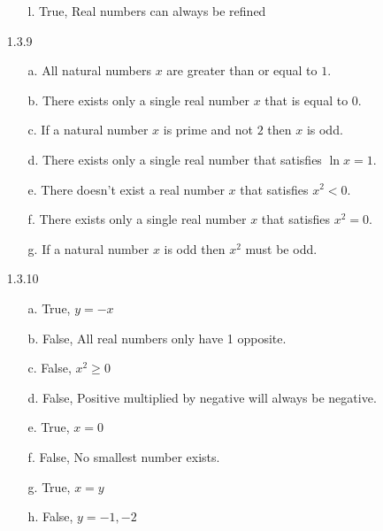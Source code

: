 \documentclass[11pt]{amsart}
\theoremstyle{definition}
\begin{document}
\begin{itemize}
\begin{itemize}
    \item[l.] True,  Real numbers can always be refined
    
\end{itemize}

\item[1.3.9]
\begin{itemize}
    \item[a.] All natural numbers $x$ are greater than or equal to $1$.

    \item[b.] There exists only a single real number $x$ that is equal to $0$.

    \item[c.] If a natural number $x$ is prime and not $2$ then $x$ is odd.

    \item[d.] There exists only a single real number that satisfies $\ln x=1$.

    \item[e.] There doesn't exist a real number $x$ that satisfies $x^2 <0$.

    \item[f.] There exists only a single real number $x$ that satisfies $x^2=0$.

    \item[g.] If a natural number $x$ is odd then $x^2$ must be odd.
    
\end{itemize}

\item[1.3.10]
\begin{itemize}
    \item[a.] True,  $y=-x$

    \item[b.] False, All real numbers only have 1 opposite.

    \item[c.] False, $x^2\ge 0$
    
    \item[d.] False, Positive multiplied by negative will always be negative.

    \item[e.] True,  $x=0$

    \item[f.] False, No smallest number exists.

    \item[g.] True,  $x=y$

    \item[h.] False, $y=-1,-2$


\end{itemize}
\end{itemize}
\end{document}
